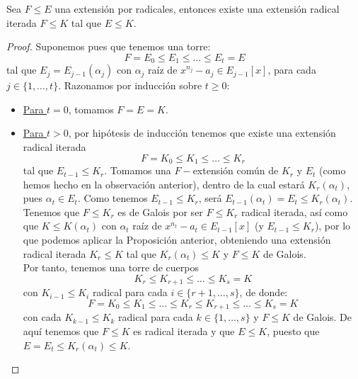 \begin{prop}
    Sea $F\leq E$ una extensión por radicales, entonces existe una extensión radical iterada $F\leq K$ tal que $E\leq K$.
    \begin{proof}
        Suponemos pues que tenemos una torre:
        \begin{equation*}
            F= E_0\leq E_1 \leq \ldots \leq E_t = E
        \end{equation*}
        tal que $E_j = E_{j-1}(\alpha_j)$ con $\alpha_j$ raíz de $x^{n_j}-a_j\in E_{j-1}[x]$, para cada $j \in \{1,\ldots,t\}$. Razonamos por inducción sobre $t\geq 0$:
        \begin{itemize}
            \item \underline{Para $t=0$}, tomamos $F=E=K$.
            \item \underline{Para $t>0$}, por hipótesis de inducción tenemos que existe una extensión radical iterada 
                \begin{equation*}
                    F=K_0\leq K_1\leq \ldots \leq K_r
                \end{equation*}
                tal que $E_{t-1}\leq K_r$. Tomamos una $F-$extensión común de $K_r$ y $E_t$ (como hemos hecho en la observación anterior), dentro de la cual estará $K_r(\alpha_t)$, pues $\alpha_t \in E_t$. Como tenemos $E_{t-1}\leq K_r$, será $E_{t-1}(\alpha_t) = E_t\leq K_r(\alpha_t)$.\\

                \noindent
                Tenemos que $F\leq K_r$ es de Galois por ser $F\leq K_r$ radical iterada, así como que $K\leq K(\alpha_t)$ con $\alpha_t$ raíz de $x^{n_t}-a_t\in E_{t-1}[x]$ (y $E_{t-1}\leq K_r$), por lo que podemos aplicar la Proposición anterior, obteniendo una extensión radical iterada $K_r\leq K$ tal que $K_r(\alpha_t)\leq K$ y $F\leq K$ de Galois.\\

                \noindent
                Por tanto, tenemos una torre de cuerpos
                \begin{equation*}
                    K_r\leq K_{r+1}\leq \ldots \leq K_s = K
                \end{equation*}
                con $K_{i-1}\leq K_i$ radical para cada $i \in \{r+1,\ldots,s\}$, de donde:
                \begin{equation*}
                    F = K_0 \leq K_1 \leq \ldots \leq K_r \leq K_{r+1}\leq \ldots \leq K_s = K
                \end{equation*}
                con cada $K_{k-1}\leq K_k$ radical para cada $k \in \{1, \ldots, s\}$ y $F\leq K$ de Galois. De aquí tenemos que $F\leq K$ es radical iterada y que $E\leq K$, puesto que $E=E_t \leq K_r(\alpha_t)\leq K$.
        \end{itemize}
    \end{proof}
\end{prop}


